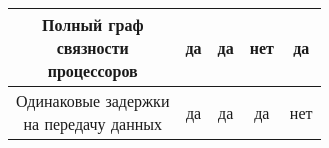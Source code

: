 \begin{table}[!htbp]
\begin{tabular}{c|c|c|c|c}
        \hline
        \makecell{Полный граф                                                                       \\связности\\процессоров}      & да                                         & да     & нет                    & да                     \\
        \hline
        \makecell{Одинаковые задержки                                                               \\на передачу данных} & да                                         & да     & да                     & нет                    \\
    \end{tabular}
\end{table}
